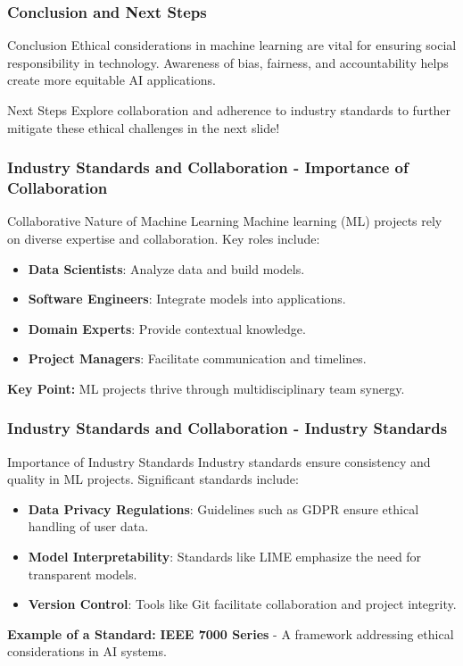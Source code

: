 \documentclass{beamer}
\begin{document}
\begin{frame}[fragile]
    \frametitle{Conclusion and Next Steps}
    \begin{block}{Conclusion}
        Ethical considerations in machine learning are vital for ensuring social responsibility in technology. Awareness of bias, fairness, and accountability helps create more equitable AI applications.
    \end{block}

    \begin{block}{Next Steps}
        Explore collaboration and adherence to industry standards to further mitigate these ethical challenges in the next slide!
    \end{block}
\end{frame}

\begin{frame}[fragile]
    \frametitle{Industry Standards and Collaboration - Importance of Collaboration}
    \begin{block}{Collaborative Nature of Machine Learning}
        Machine learning (ML) projects rely on diverse expertise and collaboration. Key roles include:
    \end{block}
    
    \begin{itemize}
        \item \textbf{Data Scientists}: Analyze data and build models.
        \item \textbf{Software Engineers}: Integrate models into applications.
        \item \textbf{Domain Experts}: Provide contextual knowledge.
        \item \textbf{Project Managers}: Facilitate communication and timelines.
    \end{itemize}
    
    \textbf{Key Point:} ML projects thrive through multidisciplinary team synergy.
\end{frame}

\begin{frame}[fragile]
    \frametitle{Industry Standards and Collaboration - Industry Standards}
    \begin{block}{Importance of Industry Standards}
        Industry standards ensure consistency and quality in ML projects. Significant standards include:
    \end{block}

    \begin{itemize}
        \item \textbf{Data Privacy Regulations}: Guidelines such as GDPR ensure ethical handling of user data.
        \item \textbf{Model Interpretability}: Standards like LIME emphasize the need for transparent models.
        \item \textbf{Version Control}: Tools like Git facilitate collaboration and project integrity.
    \end{itemize}
    
    \textbf{Example of a Standard:} \textbf{IEEE 7000 Series} 
    - A framework addressing ethical considerations in AI systems.
\end{frame}
\end{document}
